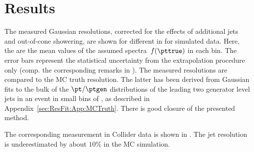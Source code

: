 \section{Results}\label{sec:ResFit:Results}

The measured Gaussian resolutions, corrected for the effects of
additional jets and out-of-cone showering, are shown for different
\ptref in  for simulated
data.
Here, the \ptref are the mean values of the assumed spectra~$f(\pttrue)$
in each \ptave bin.
The error bars represent the statistical uncertainty from the
extrapolation procedure only (comp. the corresponding remarks in
).
The measured resolutions are compared to the MC truth resolution.
The latter has been derived from Gaussian fits to the bulk of the
\mbox{$\pt / \ptgen$} distributions of the leading two generator
level jets in an event in small bins of \ptgen, as described in Appendix~\ref{sec:ResFit:App:MCTruth}.
There is good closure of the presented method.

The corresponding measurement in Collider data is shown in .
The jet \pt resolution is underestimated by about $10\%$ in the MC simulation.

